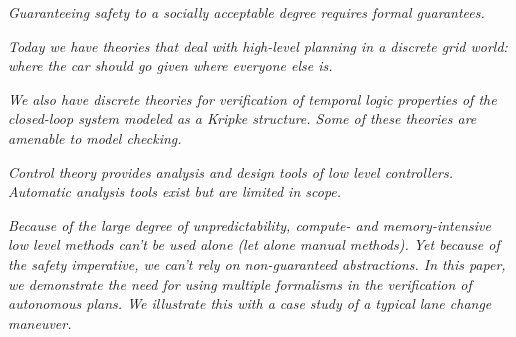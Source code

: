 

{\it Guaranteeing safety to a socially acceptable degree requires formal guarantees.}

{\it Today we have theories that deal with high-level planning in a discrete grid world: where the car should go given where everyone else is.}

{\it We also have discrete theories for verification of temporal logic properties of the closed-loop system modeled as a Kripke structure. Some of these theories are amenable to model checking.}

{\it Control theory provides analysis and design tools of low level controllers. Automatic analysis tools exist but are limited in scope.}

{\it Because of the large degree of unpredictability, compute- and memory-intensive low level methods can't be used alone (let alone manual methods). Yet because of the safety imperative, we can't rely on non-guaranteed abstractions.  In this paper, we demonstrate the need for using multiple formalisms in the verification of autonomous plans. We illustrate this with a case study of a typical lane change maneuver.}

